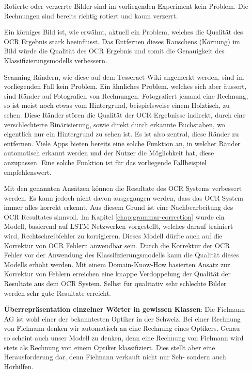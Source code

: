 Rotierte oder verzerrte Bilder sind im vorliegenden Experiment kein Problem. Die Rechnungen sind bereits richtig rotiert und kaum verzerrt.

Ein körniges Bild ist, wie erwähnt, aktuell ein Problem, welches die Qualität des OCR Ergebnis stark beeinflusst. Das Entfernen dieses Rauschens (Körnung) im Bild würde die Qualität des OCR Ergebnis und somit die Genauigkeit des Klassifizierungsmodells verbessern.

Scanning Rändern, wie diese auf dem Tesseract Wiki angemerkt werden, sind im vorliegenden Fall kein Problem. Ein ähnliches Problem, welches sich aber äussert, sind Ränder auf Fotografien von Rechnungen. Fotografiert jemand eine Rechnung, so ist meist noch etwas vom Hintergrund, beispielsweise einem Holztisch, zu sehen. Diese Ränder stören die Qualität der OCR Ergebnisse indirekt, durch eine verschlechterte Binärisierung, sowie direkt durch erkannte Buchstaben, wo eigentlich nur ein Hintergrund zu sehen ist. Es ist also zentral, diese Ränder zu entfernen. Viele Apps bieten bereits eine solche Funktion an, in welcher Ränder automatisch erkannt werden und der Nutzer die Möglichkeit hat, diese anzupassen. Eine solche Funktion ist für das vorliegende Fallbeispiel empfehlenswert.

Mit den genannten Ansätzen können die Resultate des OCR Systems verbessert werden. Es kann jedoch nicht davon ausgegangen werden, dass das OCR System immer alles korrekt erkennt. Aus diesem Grund ist eine Nachbearbeitung des OCR Resultates sinnvoll. Im Kapitel \ref{chap:grammar-correction} wurde ein Modell, basierend auf LSTM Netzwerken vorgestellt, welches darauf trainiert wird, Rechtschreibfehler zu korrigieren. Dieses Modell dürfte auch auf die Korrektur von OCR Fehlern anwendbar sein. Durch die Korrektur der OCR Fehler vor der Anwendung des Klassifizierungsmodells kann die Qualität dieses Modells erhöht werden. Mit einem Domain-Know-How basierten Ansatz zur Korrektur von Fehlern erreichen \textcite{OCRCorrection} eine knappe Verdoppelung der Qualität der Resultate aus dem OCR System. Selbst für qualitativ sehr schlechte Bilder werden sehr gute Resultate erreicht.


\textbf{Überrepräsentation einzelner Wörter in gewissen Klassen}: Die Fielmann AG ist wohl einer der bekanntesten Optiker in der Schweiz. Bei einer Rechnung von Fielmann denken wir automatisch an eine Rechnung eines Optikers. Genau so scheint auch unser Modell zu denken, denn eine Rechnung von Fielmann wird stets als Rechnung von einem Optiker klassifiziert. Dies stellt aber eine Herausforderung dar, denn Fielmann verkauft nicht nur Seh- sondern auch Hörhilfen.

